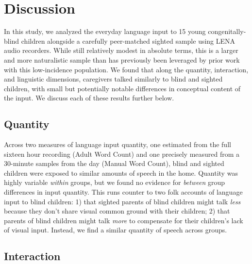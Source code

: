\documentclass[
  man,floatsintext]{apa6}
\begin{document}
\hypertarget{discussion}{%
\section{Discussion}\label{discussion}}

In this study, we analyzed the everyday language input to 15 young congenitally-blind children alongside a carefully peer-matched sighted sample using LENA audio recorders. While still relatively modest in absolute terms, this is a larger and more naturalistic sample than has previously been leveraged by prior work with this low-incidence population. We found that along the quantity, interaction, and linguistic dimensions, caregivers talked similarly to blind and sighted children, with small but potentially notable differences in conceptual content of the input. We discuss each of these results further below.

\hypertarget{quantity-1}{%
\subsection{Quantity}\label{quantity-1}}

Across two measures of language input quantity, one estimated from the full sixteen hour recording (Adult Word Count) and one precisely measured from a 30-minute samples from the day (Manual Word Count), blind and sighted children were exposed to similar amounts of speech in the home. Quantity was highly variable \emph{within} groups, but we found no evidence for \emph{between} group differences in input quantity. This runs counter to two folk accounts of language input to blind children: 1) that sighted parents of blind children might talk \emph{less} because they don't share visual common ground with their children; 2) that parents of blind children might talk \emph{more} to compensate for their children's lack of visual input. Instead, we find a similar quantity of speech across groups.

\hypertarget{interaction-2}{%
\subsection{Interaction}\label{interaction-2}}
\end{document}
